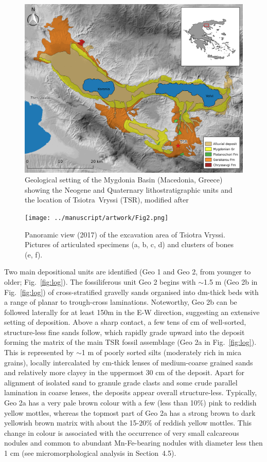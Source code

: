 \documentclass[5p,times,authoryear]{elsarticle}
\begin{document}
\begin{figure}[]
  \centering
  \includegraphics[width=1\textwidth]{../manuscript/artwork/Fig1.png}
  \caption{Geological setting of the Mygdonia Basin (Macedonia, Greece) showing the Neogene and Quaternary lithostratigraphic units and the location of Tsiotra~Vryssi (TSR), modified after \cite{Koufos1995}}
  \label{fig:1}
\end{figure}

\begin{figure}[]
  \centering
  \texttt{[image: ../manuscript/artwork/Fig2.png]}
  \caption{Panoramic view (2017) of the excavation area of Tsiotra Vryssi. Pictures of articulated specimens (a, b, c, d) and clusters of bones (e, f).}
  \label{fig:pics}
\end{figure}

Two main depositional units are identified (Geo 1 and Geo 2, from younger to older; Fig.~\ref{fig:log}). The fossiliferous unit Geo 2 begins with $\sim$1.5 m (Geo 2b in Fig.~\ref{fig:log}) of cross-stratified gravelly sands organised into dm-thick beds with a range of planar to trough-cross laminations. Noteworthy, Geo 2b can be followed laterally for at least 150m in the E-W direction, suggesting an extensive setting of deposition. Above a sharp contact, a few tens of cm of well-sorted, structure-less fine sands follow, which rapidly grade upward into the deposit forming the matrix of the main TSR fossil assemblage (Geo 2a in Fig.~\ref{fig:log}). This is represented by $\sim$1 m of poorly sorted silts (moderately rich in mica grains), locally intercalated by cm-thick lenses of medium-coarse grained sands and relatively more clayey in the uppermost 30 cm of the deposit. Apart for alignment of isolated sand to granule grade clasts and some crude parallel lamination in coarse lenses, the deposits appear overall structure-less. Typically, Geo 2a has a very pale brown colour with a few (less than 10\%) pink to reddish yellow mottles, whereas the topmost part of Geo 2a has a strong brown to dark yellowish brown matrix with about the 15-20\% of reddish yellow mottles. This change in colour is associated with the occurrence of very small calcareous nodules and common to abundant Mn-Fe-bearing nodules with diameter less then 1 cm (see micromorphological analysis in Section~4.5).
\end{document}
